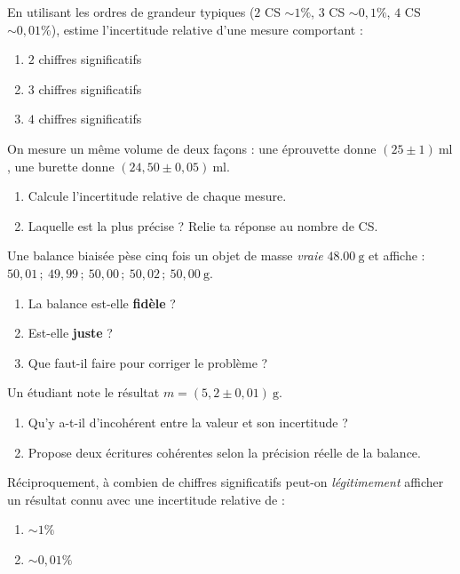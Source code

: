 \documentclass[11pt,a4paper]{article}
\begin{document}
\begin{exo}
En utilisant les ordres de grandeur typiques ($2$ CS $\sim1\%$, $3$ CS $\sim0,1\%$, $4$ CS $\sim0,01\%$),
estime l'incertitude relative d'une mesure comportant :
\begin{enumerate}[label=\alph*)]
  \item $2$ chiffres significatifs
  \item $3$ chiffres significatifs
  \item $4$ chiffres significatifs
\end{enumerate}
\end{exo}

\begin{exo}
On mesure un même volume de deux façons : une éprouvette donne $(25\pm1)\ \si{\milli\litre}$, une burette
donne $(24,50\pm0,05)\ \si{\milli\litre}$.
\begin{enumerate}[label=\alph*)]
  \item Calcule l'incertitude relative de chaque mesure.
  \item Laquelle est la plus précise ? Relie ta réponse au nombre de CS.
\end{enumerate}
\end{exo}

\begin{exo}
Une balance biaisée pèse cinq fois un objet de masse \emph{vraie} $\qty{48,00}{\gram}$ et affiche :
$50,01\,;\ 49,99\,;\ 50,00\,;\ 50,02\,;\ 50,00\ \si{\gram}$.
\begin{enumerate}[label=\alph*)]
  \item La balance est-elle \textbf{fidèle} ?
  \item Est-elle \textbf{juste} ?
  \item Que faut-il faire pour corriger le problème ?
\end{enumerate}
\end{exo}

\begin{exo}
Un étudiant note le résultat $m=(5,2\pm0,01)\ \si{\gram}$.
\begin{enumerate}[label=\alph*)]
  \item Qu'y a-t-il d'incohérent entre la valeur et son incertitude ?
  \item Propose deux écritures cohérentes selon la précision réelle de la balance.
\end{enumerate}
\end{exo}

\begin{exo}
Réciproquement, à combien de chiffres significatifs peut-on \emph{légitimement} afficher un résultat
connu avec une incertitude relative de :
\begin{enumerate}[label=\alph*)]
  \item $\sim 1\%$
  \item $\sim 0,01\%$
\end{enumerate}
\end{exo}
\end{document}
